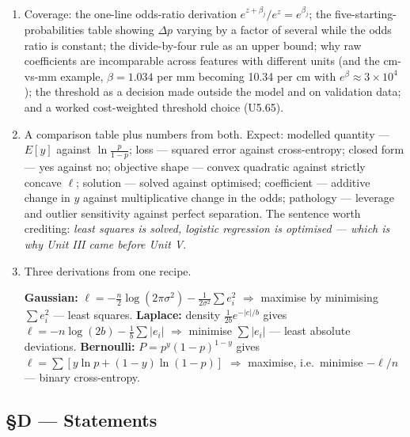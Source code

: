 \documentclass[11pt,a4paper]{article}
\newcommand{\A}[1]{\item[\textbf{#1}]}
\begin{document}
\begin{enumerate}[leftmargin=1.9cm]
\A{U5.73} Coverage: the one-line odds-ratio derivation
$e^{z+\beta_j}/e^z = e^{\beta_j}$; the five-starting-probabilities table
showing $\Delta p$ varying by a factor of several while the odds ratio is
constant; the divide-by-four rule as an upper bound; why raw coefficients are
incomparable across features with different units (and the cm-vs-mm example,
$\beta = 1.034$ per mm becoming 10.34 per cm with $e^\beta \approx 3\times10^4$);
the threshold as a decision made outside the model and on validation data; and
a worked cost-weighted threshold choice (U5.65).

\A{U5.74} A comparison table plus numbers from both. Expect: modelled quantity
--- $E[y]$ against $\ln\frac{p}{1-p}$; loss --- squared error against
cross-entropy; closed form --- yes against no; objective shape --- convex
quadratic against strictly concave $\ell$; solution --- solved against
optimised; coefficient --- additive change in $y$ against multiplicative change
in the odds; pathology --- leverage and outlier sensitivity against perfect
separation. The sentence worth crediting: \emph{least squares is solved,
logistic regression is optimised --- which is why Unit III came before
Unit V}.

\A{U5.75} Three derivations from one recipe.
\begin{answerbox}
\textbf{Gaussian:} $\ell = -\frac n2\log(2\pi\sigma^2) -
\frac{1}{2\sigma^2}\sum e_i^2$ $\Rightarrow$ maximise by minimising
$\sum e_i^2$ --- least squares.
\textbf{Laplace:} density $\frac{1}{2b}e^{-|e|/b}$ gives
$\ell = -n\log(2b) - \frac1b\sum|e_i|$ $\Rightarrow$ minimise $\sum|e_i|$ ---
least absolute deviations.
\textbf{Bernoulli:} $P = p^y(1-p)^{1-y}$ gives
$\ell = \sum[y\ln p + (1-y)\ln(1-p)]$ $\Rightarrow$ maximise, i.e.\ minimise
$-\ell/n$ --- binary cross-entropy.
\end{answerbox}
\end{enumerate}

\subsection*{§D --- Statements}
\end{document}

